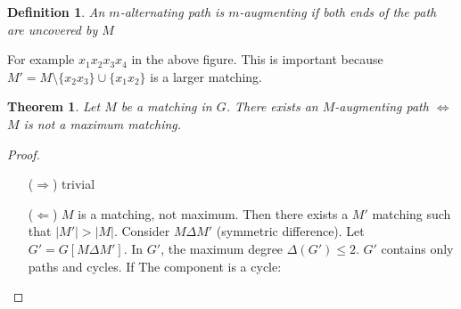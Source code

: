 \documentclass[notitlepage, 12pt]{article}
\newtheorem*{definition}{Definition}
\newtheorem*{theorem}{Theorem}
\begin{document}
\begin{definition}
  An $m$-alternating path is $m$-augmenting if both ends of the path are uncovered by $M$
\end{definition}
For example $x_1x_2x_3x_4$ in the above figure.
This is important because $M'=M \setminus \{x_2x_3\}\cup \{x_1x_2\}$
is a larger matching.
\begin{theorem}
Let $M$ be a matching in $G$. There exists an $M$-augmenting path
$\iff$ $M$ is not a maximum matching.
\end{theorem}
\begin{proof}
\begin{itemize}
  \item[($\Rightarrow$)] trivial
  \item[($\Leftarrow$)] $M$ is a matching, not maximum. Then there exists a  $M'$ matching 
  such that $|M'| > |M|$. Consider $M \Delta M'$ (symmetric difference).
  Let $G' = G[M \Delta M']$. In $G'$, the maximum degree $\Delta(G') \leq 2$. $G'$ contains
  only paths and cycles. If The component is a cycle:

  \begin{center}
  \end{center}


\end{itemize}
\end{proof}
\end{document}
